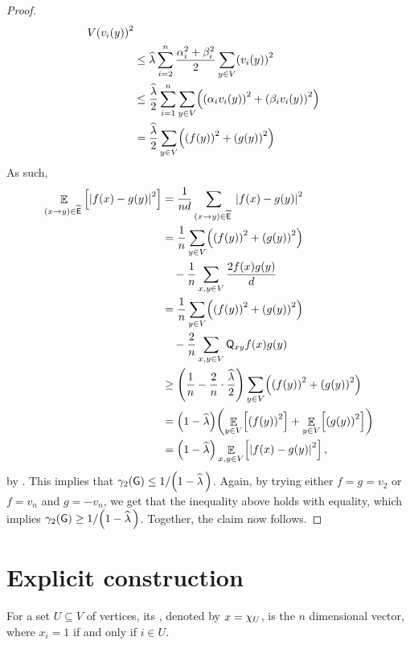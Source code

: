 \begin{proof}
\begin{align*}
{           V}\pth{v_i(y)}^2 \\%
        &\leq %
        \EVal \sum_{i=2}^n \frac{\alpha_i^2 + \beta_i^2}{2}\sum_{y\in
           V}\pth{v_i(y)}^2 \\ &\leq \frac{\EVal}{2} \sum_{i=1}^n
        \sum_{y\in V}\pth{ \pth{\alpha_iv_i(y)}^2 +
           \pth{\beta_iv_i(y)}^2 }\\
        &=%
        \frac{\EVal}{2} \sum_{y\in V} \pth{ \pth{f(y)}^2 + \pth{g(y)}^2
        }
    \end{align*}
    As such,
    \begin{align*}
        \ExExt{\dirEdge{x}{y} \in \DEdges\;}{ \cardin{f(x)-g(y)}^2 }
        &= \frac{1}{nd}\sum_{\dirEdge{x}{y} \in \DEdges\;}
        \cardin{f(x)-g(y)}^2 
        \\ &= \frac{1}{n}\sum_{y\in V} \pth{\pth{f(y)}^2 +\pth{ g(y)}^2} \\
        &\quad -
        \frac{1}{n} \sum_{x,y \in V} \frac{2 f(x)g(y)}{d}\\
        &= \frac{1}{n}\sum_{y\in V} \pth{\pth{f(y)}^2 +\pth{ g(y)}^2} \\
        &\quad -
        \frac{2}{n} \sum_{x,y \in V} \TMtrx_{xy} f(x)g(y)\\
        & \geq \pth{ \frac{1}{n}- \frac{2}{n} \cdot \frac{\EVal}{2} }
        \sum_{y\in V} \pth{\pth{f(y)}^2 +\pth{ g(y)}^2} \\ &=
        \pth{1-\EVal} \pth{ \ExExt{y \in V}{\pth[]{f(y)}^2} +
           \ExExt{y \in V}{\pth[]{g(y)}^2} }\\
        &=%
        \pth{1-\EVal} \ExExt{x,y \in V}{\cardin{f(x)- g(y)}^2},
    \end{align*}
    by .  This implies that $\BiDialX{\Graph} \leq
    {1}/\pth[]{1-\EVal\,}$. Again, by trying either $f=g= v_2$ or $f =
    v_n$ and $g= -v_n$, we get that the inequality above holds with
    equality, which implies $\displaystyle \BiDialX{\Graph} \geq {1} /
    \pth[]{1-\EVal\,}$. Together, the claim now follows.
\end{proof}




\section{Explicit construction}



For a set $U \subseteq V$ of vertices, its , denoted by $x = \chi_{U}$, is the $n$ dimensional
vector, where $x_i = 1$ if and only if $i \in U$.


